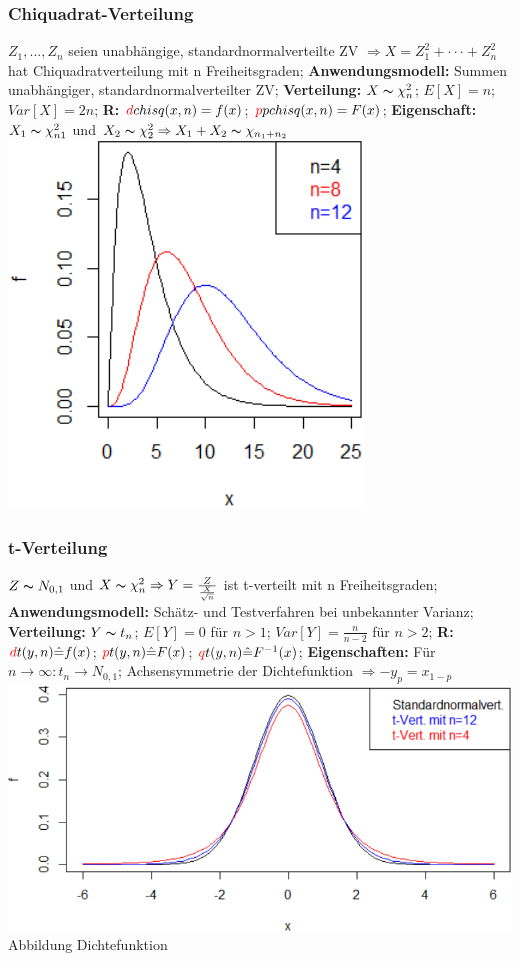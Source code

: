 \subsubsection{Chiquadrat-Verteilung}
$ Z_{1},...,Z_{n}$ seien unabhängige, standardnormalverteilte ZV $\Rightarrow  X=Z_{1}^2+···+Z_{n}^2 $ hat Chiquadratverteilung mit n Freiheitsgraden;
\textbf{Anwendungsmodell:} 
Summen unabhängiger, standardnormalverteilter ZV;
\textbf{Verteilung:} 
$ X \thicksim  \chi_{n}^2$; 
$ E[X] = n $; 
$ Var[X] = 2n $; 
\textbf{R:} 
$ \textcolor{red}{d} chisq(x,n)=f(x)$; 
$\textcolor{red}{p} pchisq(x,n)=F(x)$; 
\textbf{Eigenschaft:} 
$ X_{1} \thicksim \chi_{n1}^2 $ und $ X_{2} \thicksim \chi_{2}^2 \Rightarrow X_{1} + X_{2} \thicksim \chi_{n_{1} + n_{2}} $
\includegraphics[scale=0.25]{./pic/Chiquadratverteilung.png}
\subsubsection{t-Verteilung}
$ Z \thicksim N_{0,1} $ und $ X \thicksim \chi_{n}^2 \Rightarrow Y = \frac{Z}{\frac{X}{\sqrt{n}}} $ ist t-verteilt mit n Freiheitsgraden; 
\textbf{Anwendungsmodell:}
Schätz- und Testverfahren bei unbekannter Varianz; 
\textbf{Verteilung:} 
$ Y \thicksim t_{n} $; 
$ E[Y] = 0  $ für $ n > 1 $; 
$ Var[Y] = \frac{n}{n-2} $ für $ n > 2 $; 
\textbf{R:} 
$\textcolor{red}{d}t(y,n) \hat{=} f(x) $; 
$ \textcolor{red}{p}t(y,n) \hat{=} F(x)$; 
$ \textcolor{red}{q}t(y, n) \hat{=} F^{-1}(x)$; 
\textbf{Eigenschaften:} 
Für $ n  \rightarrow \infty : t_{n} \rightarrow N_{0,1}$; 
Achsensymmetrie der Dichtefunktion $ \Rightarrow -y_{p} = x_{1-p} $
\includegraphics[scale=0.25]{./pic/t-Verteilung.png}\\
Abbildung Dichtefunktion